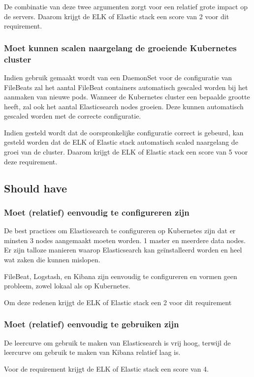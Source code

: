 De combinatie van deze twee argumenten zorgt voor een relatief grote impact op de servers. Daarom krijgt de ELK of Elastic stack een score van 2 voor dit requirement.

\subsubsection{Moet kunnen scalen naargelang de groeiende Kubernetes cluster}
Indien gebruik gemaakt wordt van een DaemonSet voor de configuratie van FileBeats zal het aantal FileBeat containers automatisch gescaled worden bij het aanmaken van nieuwe pods. Wanneer de Kubernetes cluster een bepaalde grootte heeft, zal ook het aantal Elasticsearch nodes groeien. Deze kunnen automatisch gescaled worden met de correcte configuratie.

Indien gesteld wordt dat de oorspronkelijke configuratie correct is gebeurd, kan gesteld worden dat de ELK of Elastic stack automatisch scaled naargelang de groei van de cluster. Daarom krijgt de ELK of Elastic stack een score van 5 voor deze requirement.

\subsection{Should have}
\subsubsection{Moet (relatief) eenvoudig te configureren zijn}
De best practices om Elasticsearch te configureren op Kubernetes zijn dat er minsten 3 nodes aangemaakt moeten worden. 1 master en meerdere data nodes. Er zijn talloze manieren waarop Elasticsearch kan geïnstalleerd worden en heel wat zaken die kunnen mislopen.

FileBeat, Logstash, en Kibana zijn eenvoudig te configureren en vormen geen probleem, zowel lokaal als op Kubernetes. 

Om deze redenen krijgt de ELK of Elastic stack een 2 voor dit requirement

\subsubsection{Moet (relatief) eenvoudig te gebruiken zijn}
De leercurve om gebruik te maken van Elasticsearch is vrij hoog, terwijl de leercurve om gebruik te maken van Kibana relatief laag is.

Voor de requirement krijgt de ELK of Elastic stack een score van 4.

